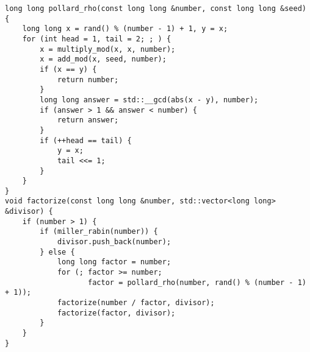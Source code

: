\begin{lstlisting}
long long pollard_rho(const long long &number, const long long &seed) {
    long long x = rand() % (number - 1) + 1, y = x;
    for (int head = 1, tail = 2; ; ) {
        x = multiply_mod(x, x, number);
        x = add_mod(x, seed, number);
        if (x == y) {
            return number;
        }
        long long answer = std::__gcd(abs(x - y), number);
        if (answer > 1 && answer < number) {
            return answer;
        }
        if (++head == tail) {
            y = x;
            tail <<= 1;
        }
    }
}
void factorize(const long long &number, std::vector<long long> &divisor) {
    if (number > 1) {
        if (miller_rabin(number)) {
            divisor.push_back(number);
        } else {
            long long factor = number;
            for (; factor >= number;
                   factor = pollard_rho(number, rand() % (number - 1) + 1));
            factorize(number / factor, divisor);
            factorize(factor, divisor);
        }
    }
}
\end{lstlisting}
